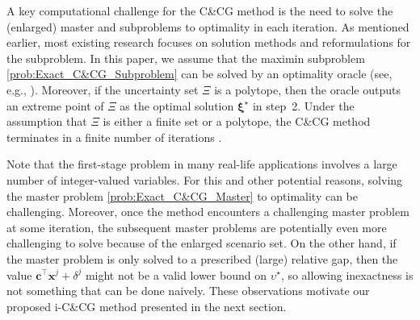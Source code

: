 \documentclass[preprint,review,11pt]{elsarticle}
\theoremstyle{definition}
\theoremstyle{remark}
\newcommand{\tp}{\top}
\newcommand{\xb}{\pmb{x}}
\newcommand{\cb}{\pmb{c}}
\newcommand{\xib}{\pmb{\xi}}
\begin{document}
A key computational challenge for the C\&CG method is the need to solve the (enlarged) master and subproblems to optimality in each iteration. As mentioned earlier, most existing research focuses on solution methods and reformulations for the subproblem.  In this paper, we assume that the maximin subproblem \eqref{prob:Exact_C&CG_Subproblem} can be solved by an optimality oracle (see, e.g., \cite{Bertsimas_Shtern:2018,Zeng_Zhao:2013}). Moreover, if the uncertainty set $\Xi$ is a polytope, then the oracle outputs an extreme point of $\Xi$ as the optimal solution $\xib^\star$ in step~2. Under the assumption that $\Xi$ is either a finite set or a polytope, the C\&CG method terminates in a finite number of iterations \citep{Bertsimas_Shtern:2018,Zeng_Zhao:2013}.

Note that the first-stage problem in many real-life applications involves a large number of integer-valued variables.  For this and other potential reasons, solving the master problem \eqref{prob:Exact_C&CG_Master} to optimality can be challenging. Moreover, once the method encounters a challenging master problem at some iteration, the subsequent master problems are potentially even more challenging to solve because of the enlarged scenario set. On the other hand, if the master problem is only solved to a prescribed (large) relative gap, then the value $\cb^\tp\xb^j+\delta^j$ might not be a valid lower bound on $\upsilon^\star$, so allowing inexactness is not something that can be done naively.  These observations motivate our proposed i-C\&CG method presented in the next section.
%
\IncMargin{0em}
\end{document}
